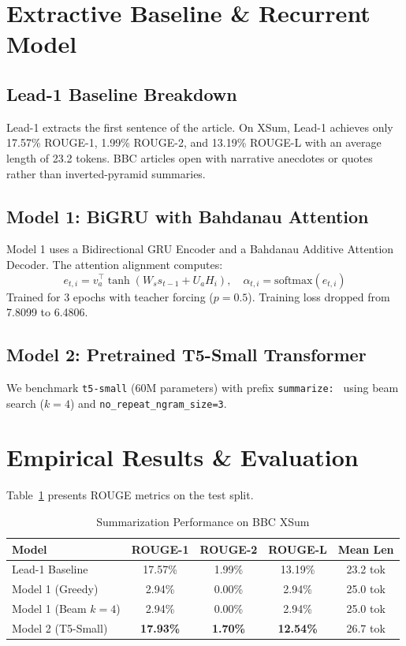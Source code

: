 \documentclass[conference]{IEEEtran}
\begin{document}
\section{Extractive Baseline \& Recurrent Model}
\subsection{Lead-1 Baseline Breakdown}
Lead-1 extracts the first sentence of the article. On XSum, Lead-1 achieves only 17.57\% ROUGE-1, 1.99\% ROUGE-2, and 13.19\% ROUGE-L with an average length of 23.2 tokens. BBC articles open with narrative anecdotes or quotes rather than inverted-pyramid summaries.

\subsection{Model 1: BiGRU with Bahdanau Attention}
Model 1 uses a Bidirectional GRU Encoder and a Bahdanau Additive Attention Decoder. The attention alignment computes:
\begin{equation}
e_{t, i} = v_a^\top \tanh(W_s s_{t-1} + U_a H_i), \quad \alpha_{t, i} = \text{softmax}(e_{t, i})
\end{equation}
Trained for 3 epochs with teacher forcing ($p=0.5$). Training loss dropped from 7.8099 to 6.4806.

\subsection{Model 2: Pretrained T5-Small Transformer}
We benchmark \texttt{t5-small} (60M parameters) with prefix \texttt{summarize: } using beam search ($k=4$) and \texttt{no\_repeat\_ngram\_size=3}.

\section{Empirical Results \& Evaluation}
Table~\ref{tab:rouge} presents ROUGE metrics on the test split.

\begin{table}[htbp]
\caption{Summarization Performance on BBC XSum}
\label{tab:rouge}
\centering
\begin{tabular}{lcccc}
\toprule
\textbf{Model} & \textbf{ROUGE-1} & \textbf{ROUGE-2} & \textbf{ROUGE-L} & \textbf{Mean Len} \\
\midrule
Lead-1 Baseline & 17.57\% & 1.99\% & 13.19\% & 23.2 tok \\
Model 1 (Greedy) & 2.94\% & 0.00\% & 2.94\% & 25.0 tok \\
Model 1 (Beam $k=4$) & 2.94\% & 0.00\% & 2.94\% & 25.0 tok \\
Model 2 (T5-Small) & \textbf{17.93\%} & \textbf{1.70\%} & \textbf{12.54\%} & 26.7 tok \\
\bottomrule
\end{tabular}
\end{table}
\end{document}
